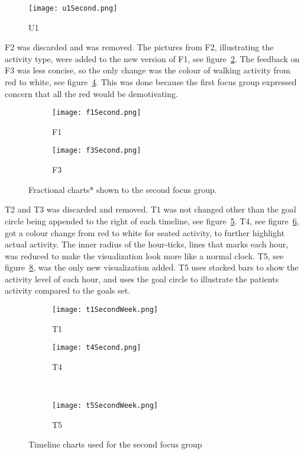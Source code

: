 \begin{figure}[h!]
  \centering
  \texttt{[image: u1Second.png]}
  \caption{U1}
  \label{fig:uSecond}
\end{figure}

F2 was discarded and was removed. The pictures from F2, illustrating the activity type, were added to the new version of F1, see figure~\ref{fig:f1Second}. The feedback on F3 was less concise, so the only change was the colour of walking activity from red to white, see figure~\ref{fig:f3Second}. This was done because the first focus group expressed concern that all the red would be demotivating.

\begin{figure}[h!]
  \centering
  \begin{subfigure}[b]{0.45\textwidth}
    \centering
    \texttt{[image: f1Second.png]}
    \caption{F1}
    \label{fig:f1Second}
  \end{subfigure}
  \begin{subfigure}[b]{0.45\textwidth}
    \centering
    \texttt{[image: f3Second.png]}
    \caption{F3}
    \label{fig:f3Second}
  \end{subfigure}
  \caption{Fractional charts* shown to the second focus group.}
\end{figure}

T2 and T3 was discarded and removed. T1 was not changed other than the goal circle being appended to the right of each timeline, see figure~\ref{fig:t1}. T4, see figure~\ref{fig:t4}, got a colour change from red to white for seated activity, to further highlight actual activity. The inner radius of the hour-ticks, lines that marks each hour, was reduced to make the visualization look more like a normal clock. T5, see figure~\ref{fig:t5}, was the only new visualization added. T5 uses stacked bars to show the activity level of each hour, and uses the goal circle to illustrate the patients activity compared to the goals set.

\begin{figure}[h!]
  \centering
  \begin{subfigure}[b]{0.6\textwidth}
    \centering
    \texttt{[image: t1SecondWeek.png]}
    \caption{T1}
    \label{fig:t1}
  \end{subfigure}
  \begin{subfigure}[b]{0.35\textwidth}
    \centering
    \texttt{[image: t4Second.png]}
    \caption{T4}
    \label{fig:t4}
  \end{subfigure}
  \\
  \begin{subfigure}[b]{0.95\textwidth}
    \centering
    \texttt{[image: t5SecondWeek.png]}
    \caption{T5}
    \label{fig:t5}
  \end{subfigure}
  \caption{Timeline charts used for the second focus group}
\end{figure}


